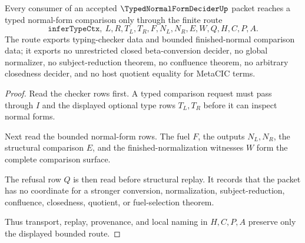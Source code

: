 \begin{theorem}
\label{thm:typed-normal-form-decider-bounded-comparison-boundary}
Every consumer of an accepted $\TypedNormalFormDeciderUp$ packet reaches a typed normal-form comparison only through the finite route
$$
\texttt{inferTypeCtx},\ L,R,T_L,T_R,F,N_L,N_R,E,W,Q,H,C,P,A .
$$
The route exports typing-checker data and bounded finished-normal comparison data; it exports no unrestricted closed beta-conversion decider, no global normalizer, no subject-reduction theorem, no confluence theorem, no arbitrary closedness decider, and no host quotient equality for MetaCIC terms.
\end{theorem}
\begin{proof}
Read the checker rows first. A typed comparison request must pass through $I$ and the displayed optional type rows $T_L,T_R$ before it can inspect normal forms.

Next read the bounded normal-form rows. The fuel $F$, the outputs $N_L,N_R$, the structural comparison $E$, and the finished-normalization witnesses $W$ form the complete comparison surface.

The refusal row $Q$ is then read before structural replay. It records that the packet has no coordinate for a stronger conversion, normalization, subject-reduction, confluence, closedness, quotient, or fuel-selection theorem.

Thus transport, replay, provenance, and local naming in $H,C,P,A$ preserve only the displayed bounded route.
\end{proof}


\begin{closurestatus}{\TypedNormalFormDeciderUp}
  \theoryclosure{\seedClosure}
  \formalstatus{\unformalizedV}
\end{closurestatus}
